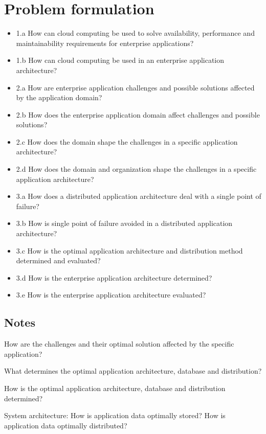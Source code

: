 \section{Problem formulation}
\label{sc:problem_formulation}

\begin{itemize}  
\item 1.a How can cloud computing be used to solve availability, performance and maintainability requirements for enterprise applications?
\item 1.b How can cloud computing be used in an enterprise application architecture?

\item 2.a How are enterprise application challenges and possible solutions affected by the application domain?
\item 2.b How does the enterprise application domain affect challenges and possible solutions?
\item 2.c How does the domain shape the challenges in a specific application architecture?
\item 2.d How does the domain and organization shape the challenges in a specific application architecture?

\item 3.a How does a distributed application architecture deal with a single point of failure?
\item 3.b How is single point of failure avoided in a distributed application architecture?

\item 3.c How is the optimal application architecture and distribution method determined and evaluated?
\item 3.d How is the enterprise application architecture determined?
\item 3.e How is the enterprise application architecture evaluated?
\end{itemize}

\subsection*{Notes}
How are the challenges and their optimal solution affected by the specific application?

What determines the optimal application architecture, database and distribution?

How is the optimal application architecture, database and distribution determined?

System architecture:
How is application data optimally stored?
How is application data optimally distributed?

